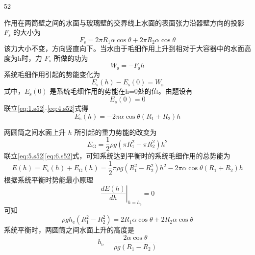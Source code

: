 \begin{solution}{52}
\begin{subsolution}
作用在两筒壁之间的水面与玻璃壁的交界线上水面的表面张力沿器壁方向的投影 $F_{s}$ 的大小为
\begin{equation}
F_{\mathrm{s}} = 2\pi R_{1}\alpha\cos\theta + 2\pi R_{2}\alpha\cos\theta
\label{eq:1.s52}
\end{equation}
该力大小不变，方向竖直向下。当水由于毛细作用上升到相对于大容器中的水面高度为h时，力 $F_{s}$ 所做的功为
\begin{equation}
W_{\mathrm{s}} = -F_{\mathrm{s}}h
\label{eq:2.s52}
\end{equation}
系统毛细作用引起的势能变化为
\begin{equation}
E_{\mathrm{s}}(h) - E_{\mathrm{s}}(0) = W_{\mathrm{s}}
\label{eq:3.s52}
\end{equation}
式中，$E_{\mathrm{s}}(0)$ 是系统毛细作用的势能在h=0处的值。由题设有
\begin{equation}
E_{s}(0) = 0
\label{eq:4.s52}
\end{equation}
联立\eqref{eq:1.s52}-\eqref{eq:4.s52}式得
\begin{equation}
E_{\mathrm{s}}(h) = -2\pi\alpha\cos\theta\left(R_{1}+R_{2}\right)h
\label{eq:5.s52}
\end{equation}
\end{subsolution}
\begin{subsolution}
两圆筒之间水面上升 $h$ 所引起的重力势能的改变为
\begin{equation}
E_{\mathrm{G}} = \frac{1}{2}\rho g(\pi R_{1}^{2} - \pi R_{2}^{2})h^{2}
\label{eq:6.s52}
\end{equation}
联立\eqref{eq:5.s52}\eqref{eq:6.s52}式，可知系统达到平衡时的系统毛细作用的总势能为
\begin{equation}
E(h) = E_{\mathrm{s}}(h) + E_{\mathrm{G}}(h) = \frac{1}{2}\pi\rho g(R_{1}^{2} - R_{2}^{2})h^{2} - 2\pi\alpha\cos\theta(R_{1}+R_{2})h
\label{eq:7.s52}
\end{equation}
根据系统平衡时势能最小原理
\begin{equation}
\left.\frac{dE(h)}{dh}\right|_{h=h_{\mathrm{e}}} = 0
\label{eq:8.s52}
\end{equation}
可知
\begin{equation}
\rho g h_{\mathrm{e}}(R_{1}^{2} - R_{2}^{2}) = 2R_{1}\alpha\cos\theta + 2R_{2}\alpha\cos\theta
\label{eq:9.s52}
\end{equation}
系统平衡时，两圆筒之间水面上升的高度是
\begin{equation}
h_{\mathrm{e}} = \frac{2\alpha\cos\theta}{\rho g(R_{1} - R_{2})}

\end{equation}
\end{subsolution}
\end{solution}
